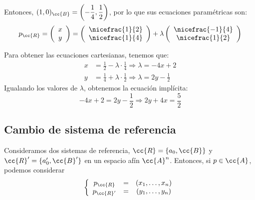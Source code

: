 \begin{ejemplo}
    Entonces, $(1,0)_{\cc{B}}=\left(-\dfrac{1}{4},\dfrac{1}{2}\right)$, por lo que sus ecuaciones paramétricas son:
    \begin{equation*}
        p_{\cc{R}}=
        \left(\begin{array}{c}
            x \\ y
        \end{array}\right)
        = \left(\begin{array}{c}
            \nicefrac{1}{2} \\ \nicefrac{1}{4}
        \end{array}\right)
        +\lambda \left(\begin{array}{c}
            \nicefrac{-1}{4} \\ \nicefrac{1}{2}
        \end{array}\right)
    \end{equation*}

    Para obtener las ecuaciones cartesianas, tenemos que:
    \begin{equation*}
        \begin{split}
            x&= \frac{1}{2} -\lambda\cdot \frac{1}{4} \Longrightarrow \lambda = -4x+2\\
            y&= \frac{1}{4} + \lambda\cdot \frac{1}{2} \Longrightarrow \lambda =2y - \frac{1}{2}
        \end{split}
    \end{equation*}
    Igualando los valores de $\lambda$, obtenemos la ecuación implícita:
    \begin{equation*}
        -4x+2 = 2y - \frac{1}{2} \Longrightarrow 2y + 4x = \frac{5}{2}
    \end{equation*}
\end{ejemplo}


\subsection{Cambio de sistema de referencia}

Consideramos dos sistemas de referencia, $\cc{R}=\{a_0,\cc{B}\}$ y $\cc{R}'=\{a_0',\cc{B}'\}$ en un espacio afín $\cc{A}^n$. Entonces, si $p\in \cc{A}$, podemos considerar
\begin{equation*}
    \left\{\begin{array}{ccc}
        p_{\cc{R}} & = & (x_1,\dots,x_n) \\
        p_{\cc{R}'} & = & (y_1,\dots,y_n) \\
    \end{array}\right.
\end{equation*}


